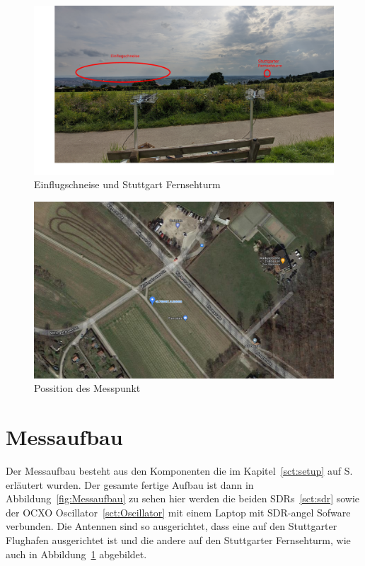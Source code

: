 \begin{figure}
    \centering
    \includegraphics[width=\textwidth]{images/Einflugschneise.jpg}
    \caption{Einflugschneise und Stuttgart Fernsehturm}\label{fig:Einflugschneise}
\end{figure}

\begin{figure}
    \centering
    \includegraphics[width=\textwidth]{images/Maps_Messpunkt.png}
    \caption{Possition des Messpunkt}\label{fig:Maps}
\end{figure}

\section{Messaufbau}
Der Messaufbau besteht aus den Komponenten die im Kapitel~\ref{sct:setup} auf S.\pageref{sct:setup} erläutert wurden. Der gesamte fertige Aufbau ist dann in Abbildung~\ref{fig:Messaufbau} zu sehen hier werden die beiden SDRs~\ref{sct:sdr} sowie der OCXO Oscillator~\ref{sct:Oscillator} mit einem Laptop mit SDR-angel Sofware verbunden. Die Antennen sind so ausgerichtet, dass eine auf den Stuttgarter Flughafen ausgerichtet ist und die andere auf den Stuttgarter Fernsehturm, wie auch in Abbildung~\ref{fig:Einflugschneise} abgebildet.

